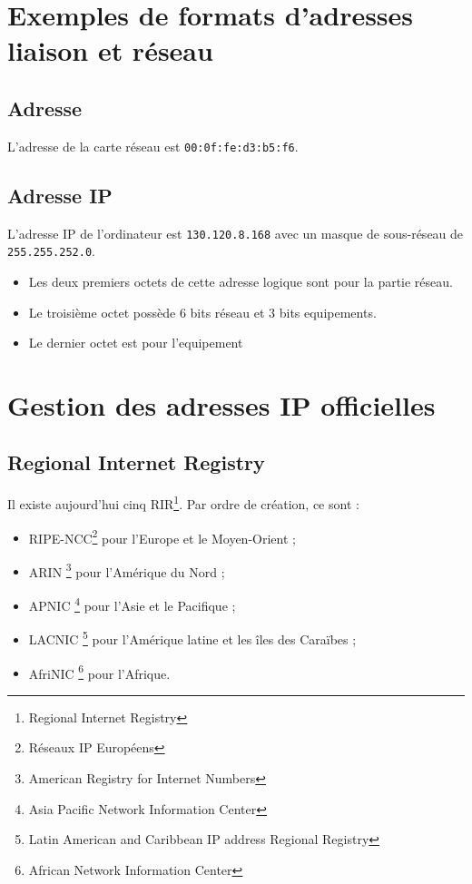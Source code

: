 \documentclass[a4paper, 11pt]{article}
\newcommand{\mac}{\bsc{mac}}
\begin{document}
	\section{Exemples de formats d'adresses liaison et réseau}
	\subsection{Adresse \mac}
	L'adresse \mac{} de la carte réseau est \texttt{00:0f:fe:d3:b5:f6}.
	\subsection{Adresse IP}
	L'adresse IP de l'ordinateur est \texttt{130.120.8.168} avec un masque de sous-réseau de \texttt{255.255.252.0}.

	\begin{itemize}
		\item Les deux premiers octets de cette adresse logique sont pour la partie réseau. 
		\item Le troisième octet possède 6 bits réseau et 3 bits equipements.
		\item Le dernier octet est pour l'equipement
	\end{itemize}

	\section{Gestion des adresses IP officielles}
	\subsection{Regional Internet Registry}
	Il existe aujourd'hui cinq RIR\footnote{Regional Internet Registry}. Par ordre de création, ce sont :
	\begin{itemize}
		\item RIPE-NCC\footnote{Réseaux IP Européens} pour l'Europe et le Moyen-Orient ;
		\item ARIN \footnote{American Registry for Internet Numbers} pour l'Amérique du Nord ;
		\item APNIC \footnote{Asia Pacific Network Information Center} pour l'Asie et le Pacifique ;
		\item LACNIC \footnote{Latin American and Caribbean IP address Regional Registry} pour l'Amérique latine et les îles des Caraïbes ;
		\item AfriNIC \footnote{African Network Information Center} pour l'Afrique.
	\end{itemize}
\end{document}
